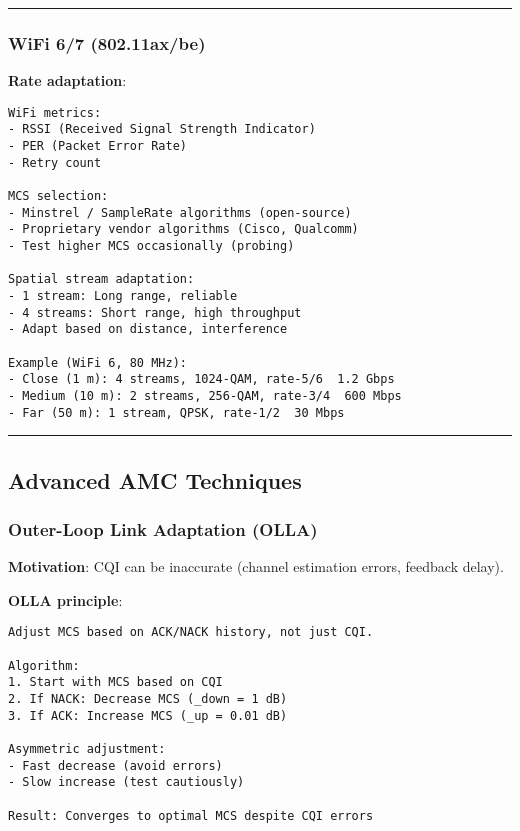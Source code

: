 \begin{center}\rule{0.5\linewidth}{0.5pt}\end{center}

\subsubsection{WiFi 6/7 (802.11ax/be)}\label{wifi-67-802.11axbe}

\textbf{Rate adaptation}:

\begin{verbatim}
WiFi metrics:
- RSSI (Received Signal Strength Indicator)
- PER (Packet Error Rate)
- Retry count

MCS selection:
- Minstrel / SampleRate algorithms (open-source)
- Proprietary vendor algorithms (Cisco, Qualcomm)
- Test higher MCS occasionally (probing)

Spatial stream adaptation:
- 1 stream: Long range, reliable
- 4 streams: Short range, high throughput
- Adapt based on distance, interference

Example (WiFi 6, 80 MHz):
- Close (1 m): 4 streams, 1024-QAM, rate-5/6  1.2 Gbps
- Medium (10 m): 2 streams, 256-QAM, rate-3/4  600 Mbps
- Far (50 m): 1 stream, QPSK, rate-1/2  30 Mbps
\end{verbatim}

\begin{center}\rule{0.5\linewidth}{0.5pt}\end{center}

\subsection{\texorpdfstring{ Advanced AMC
Techniques}{ Advanced AMC Techniques}}\label{advanced-amc-techniques}

\subsubsection{Outer-Loop Link Adaptation
(OLLA)}\label{outer-loop-link-adaptation-olla}

\textbf{Motivation}: CQI can be inaccurate (channel estimation errors,
feedback delay).

\textbf{OLLA principle}:

\begin{verbatim}
Adjust MCS based on ACK/NACK history, not just CQI.

Algorithm:
1. Start with MCS based on CQI
2. If NACK: Decrease MCS (_down = 1 dB)
3. If ACK: Increase MCS (_up = 0.01 dB)

Asymmetric adjustment:
- Fast decrease (avoid errors)
- Slow increase (test cautiously)

Result: Converges to optimal MCS despite CQI errors
\end{verbatim}

